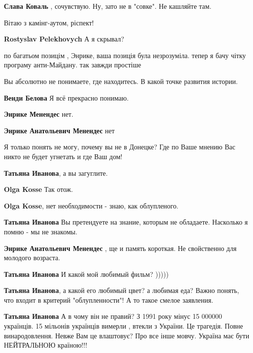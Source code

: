 \begin{itemize}
\begin{itemize}
\textbf{Слава Коваль} , сочувствую.
Ну, зато не в "совке".
Не кашляйте там.
\end{itemize} %

Вітаю з камінг-аутом, ріспект!

\begin{itemize} %
\textbf{Rostyslav Pelekhovych} А я скрывал?

по багатьом позицім , Энрике, ваша позиція була незрозуміла. тепер я бачу чітку програму анти-Майдану. так завжди простіше
\end{itemize} %

Вы абсолютно не понимаете, где находитесь. В какой точке развития истории.

\begin{itemize} %
\textbf{Венди Белова} Я всё прекрасно понимаю.

\textbf{Энрике Менендес} нет.

\textbf{Энрике Анатольевич Менендес} нет
\end{itemize} %


Я только понять не могу, почему вы не в Донецке? Где по Ваше мнению Вас никто
не будет угнетать и где Ваш дом!

\begin{itemize} %
\textbf{Татьяна Иванова}, а вы загуглите.

\textbf{Olga Kosse} Так отож.

\textbf{Olga Kosse}, нет необходимости - знаю, как облупленого.


\textbf{Татьяна Иванова} Вы претендуете на знание, которым не обладаете. Насколько я помню - мы не знакомы.

\textbf{Энрике Анатольевич Менендес} , ще и память короткая. Не свойственно для молодого возраста.


\textbf{Татьяна Иванова} И какой мой любимый фильм? )))))

\textbf{Татьяна Иванова}, а какой его любимый цвет? а любимая еда? Важно понять, что входит в критерий "облупленности"! А то такое смелое заявления.

\textbf{Татьяна Иванова} А в чому він не правий? З 1991 року мінус 15 000000 українців. 15 мільонів українців вимерли , втекли з України. Це трагедія. Повне винародовлення.
Невже Вам це влаштовує?
Про все інше мовчу.
Україна має бути НЕЙТРАЛЬНОЮ країною!!!


\end{itemize}
\end{itemize}
